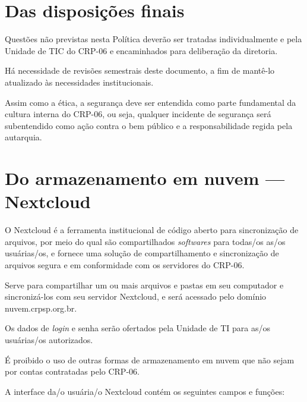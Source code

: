 \documentclass[openright, twoside, a4paper]{memoir}
\begin{document}
\clearpage\chapter{Das disposições finais}

Questões não previstas nesta Política deverão ser tratadas
individualmente e pela Unidade de TIC do CRP-06 e encaminhados para
deliberação da diretoria.

Há necessidade de revisões semestrais deste documento, a fim de mantê-lo
atualizado às necessidades institucionais.

Assim como a ética, a segurança deve ser entendida como parte
fundamental da cultura interna do CRP-06, ou seja, qualquer incidente de
segurança será subentendido como ação contra o bem público e a
responsabilidade regida pela autarquia.

\backmatter
\chapter{Do armazenamento em nuvem --- Nextcloud}

O Nextcloud é a ferramenta institucional de código aberto para
sincronização de arquivos, por meio do qual são compartilhados
\emph{softwares} para todas/os as/os usuárias/os, e fornece uma solução
de compartilhamento e sincronização de arquivos segura e em conformidade
com os servidores do CRP-06.

Serve para compartilhar um ou mais arquivos e pastas em seu computador e
sincronizá-los com seu servidor Nextcloud, e será acessado pelo domínio
nuvem.crpsp.org.br.

Os dados de \emph{login} e senha serão ofertados pela Unidade de TI para
as/os usuárias/os autorizados.

É proibido o uso de outras formas de armazenamento em nuvem que não
sejam por contas contratadas pelo CRP-06.

A interface da/o usuária/o Nextcloud contém os seguintes campos e
funções:
\end{document}
